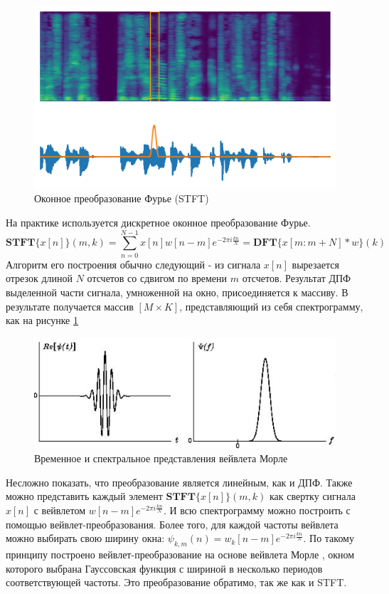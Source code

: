 \begin{figure}
  \centering
  \includegraphics[width=16cm]{figures/stft}
  \caption{Оконное преобразование Фурье (STFT)}
  \label{fig:stft}
\end{figure}

На практике используется дискретное оконное преобразование Фурье.
\begin{equation}
  \textbf{STFT}\{x[n]\} (m, k) = \sum_{n=0}^{N-1} x[n] w[n - m] e^{-2\pi i  \frac{k n}{N}} = \textbf{DFT}\{x[m:m+N] * w\}(k)
\end{equation}
Алгоритм его построения обычно следующий - из сигнала \(x[n]\) вырезается отрезок длиной \(N\) отсчетов со сдвигом по времени \(m\) отсчетов. 
Результат ДПФ выделенной части сигнала, умноженной на окно, присоединяется к массиву. В результате получается массив \([M \times K]\), 
представляющий из себя спектрограмму, как на рисунке \ref{fig:stft}

\begin{figure}
  \includegraphics[width=0.9\linewidth]{figures/wavelet}
  \caption{Временное и спектральное представления вейвлета Морле \cite{MorleWavelet}}
  \label{fig:wavelet}
\end{figure}

Несложно показать, что преобразование является линейным, как и ДПФ.
Также можно представить каждый элемент $\textbf{STFT}\{x[n]\} (m, k)$ как свертку сигнала $x[n]$ с вейвлетом $w[n - m] e^{-2\pi i  \frac{k n}{N}}$.
И всю спектрограмму можно построить с помощью вейвлет-преобразования. Более того, для каждой частоты вейвлета можно выбирать свою ширину окна: 
$\psi_{k,m}(n) = w_k[n - m] e^{-2\pi i  \frac{k n}{N}}$. По такому принципу построено вейвлет-преобразование на основе вейвлета Морле \cite{MorleWavelet}, 
окном которого выбрана Гауссовская функция с шириной в несколько периодов соответствующей частоты. Это преобразование обратимо, так же как и STFT.

